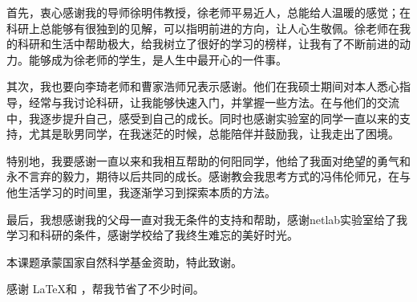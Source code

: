 \begin{acknowledgement}
  首先，衷心感谢我的导师徐明伟教授，徐老师平易近人，总能给人温暖的感觉；在科研上总能够有很独到的见解，可以指明前进的方向，让人心生敬佩。徐老师在我的科研和生活中帮助极大，给我树立了很好的学习的榜样，让我有了不断前进的动力。能够成为徐老师的学生，是人生中最开心的一件事。

  其次，我也要向李琦老师和曹家浩师兄表示感谢。他们在我硕士期间对本人悉心指导，经常与我讨论科研，让我能够快速入门，并掌握一些方法。在与他们的交流中，我逐步提升自己，感受到自己的成长。同时也感谢实验室的同学一直以来的支持，尤其是耿男同学，在我迷茫的时候，总能陪伴并鼓励我，让我走出了困境。

  特别地，我要感谢一直以来和我相互帮助的何阳同学，他给了我面对绝望的勇气和永不言弃的毅力，期待以后共同的成长。感谢教会我思考方式的冯伟伦师兄，在与他生活学习的时间里，我逐渐学习到探索本质的方法。

  最后，我想感谢我的父母一直对我无条件的支持和帮助，感谢netlab实验室给了我学习和科研的条件，感谢学校给了我终生难忘的美好时光。

  本课题承蒙国家自然科学基金资助，特此致谢。

  感谢 \LaTeX 和 \thuthesis\cite{thuthesis}，帮我节省了不少时间。
\end{acknowledgement}
